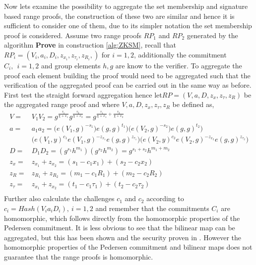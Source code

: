 Now lets examine the possibility to aggregate the set membership and signature based range proofs, the construction of these two are similar and hence it is sufficient to consider one of them, due to  its simpler notation the set membership proof is considered. Assume two range proofs $RP_1$ and $RP_2$ generated by the algorithm \textbf{Prove} in construction \ref{alg:ZKSM}, recall that $RP_i = (V_i,a_i,D_i,z_{x_i},z_{\tau _i},z_{R_i}, )$ for $i=1,2$,  additionally the commitment $C_i, \:\: i=1,2$ and group elements $h,g$ are know to the verifier. To aggregate the proof each element building the proof would need to be aggregated such that the verification of the aggregated proof can be carried out in the same way as before. First test the straight forward aggregation hence let$RP = (V,a,D,z_{x},z_{\tau },z_{R})$ be the aggregated range proof and  where $V, a, D,z_{x},z_{\tau },z_{R}$ be defined as,
\begin{equation}
\begin{aligned}
\label{eq:naiveAgg}
V =& V_1V_2 = g^{\frac{\tau_1}{\chi + x_1}}g^{\frac{\tau_2}{\chi + x_2}}  = g^{\frac{\tau_1}{\chi + x_1} + \frac{\tau_2}{\chi + x_2}}  \\
a =& a_1a_2 = \big(e(V_1,g)^{-s_1})e(g,g)^{t_1}\big)  \big(e(V_2,g)^{-s_2})e(g,g)^{t_2}\big) \\
& \big(e(V_1,y)^{c_1}e(V_1,g)^{-z_{x_1}}e(g,g)^{z_{\tau_1}} \big )   \big(e(V_2,y)^{c_2}e(V_2,g)^{-z_{x_2}}e(g,g)^{z_{\tau_2}} \big ) \\
D =& D_1D_2 = ( g^{s_1}h^{m_1} ) (g^{s_2} h^{m_2}) = g^{s_1+s_2}h^{m_1+m_2}\\
z_x =& z_{x_1} + z_{x_2} = (s_1-c_1x_1)+(s_2-c_2x_2)\\
z_R =& z_{R_1} + z_{R_2} = (m_1-c_1R_1)+(m_2-c_2R_2)\\
z_\tau =& z_{x_1} + z_{x_2} = (t_1-c_1\tau_1)+(t_2-c_2\tau_2)\\ 
\end{aligned} 
\end{equation}
Further also calculate the challenges $c_1$ and $c_2$ according to $c_i=Hash(V_i a_iD_i),\: i=1,2$ and remember that the  commitments $C_i$  are homomorphic, which  follows directly from the homomorphic properties of the Pedersen commitment. It is less obvious to see that the bilinear map can be aggregated, but this has been shown and the security proven in \cite{aggregate_bm}. However the homomorphic properties of the Pedersen commitment and bilinear maps does not guarantee that the range proofs is homomorphic. 


